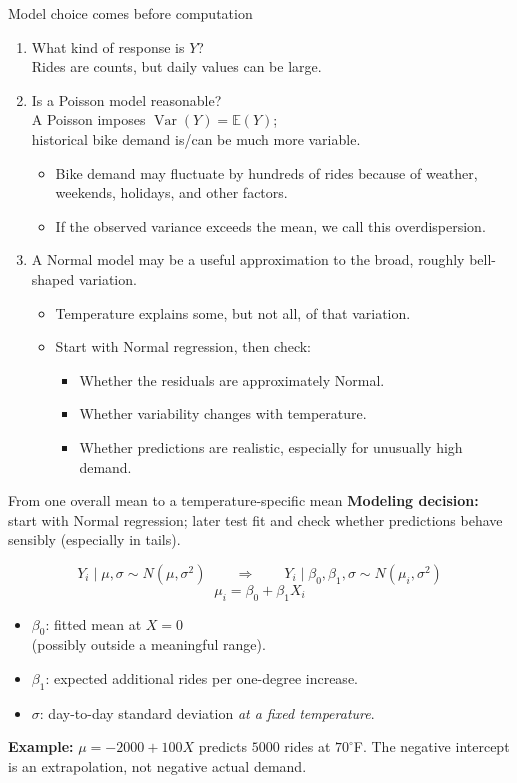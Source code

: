 \documentclass[aspectratio=43,11pt]{beamer}
\newcommand{\E}{\mathbb{E}}
\begin{document}
\begin{frame}{Model choice comes before computation}
\small
\begin{enumerate}
\item What kind of response is $Y$?\\ \footnotesize{Rides are counts, but daily values can be large.}
\item Is a Poisson model reasonable?\\\footnotesize{A Poisson imposes $\operatorname{Var}(Y)=\E(Y)$;\\historical bike demand is/can be much more variable.}
\begin{itemize}
\item \footnotesize{Bike demand may fluctuate by hundreds of rides because of weather, weekends, holidays, and other factors.}
\item \footnotesize{If the observed variance exceeds the mean, we call this overdispersion.}
\end{itemize}
\item A Normal model may be a useful approximation to the broad, roughly bell-shaped variation.
\begin{itemize}
\item \footnotesize{Temperature explains some, but not all, of that variation.}
\item \footnotesize{Start with Normal regression, then check:}
\begin{itemize}
\item \footnotesize{Whether the residuals are approximately Normal.}
\item \footnotesize{Whether variability changes with temperature.}
\item \footnotesize{Whether predictions are realistic, especially for unusually high demand.}
\end{itemize}
\end{itemize}
\end{enumerate}
\end{frame}

\begin{frame}{From one overall mean to a temperature-specific mean}
\textbf{Modeling decision:} start with Normal regression; later test fit and check whether predictions behave sensibly (especially in tails).

\[Y_i\mid\mu,\sigma\sim N(\mu,\sigma^2)\qquad\Longrightarrow\qquad
Y_i\mid\beta_0,\beta_1,\sigma\sim N(\mu_i,\sigma^2)\]
\[\boxed{\mu_i=\beta_0+\beta_1 X_i}\]

\begin{itemize}
\item $\beta_0$: fitted mean at $X=0$\\ \footnotesize{(possibly outside a meaningful range).}
\item $\beta_1$: expected additional rides per one-degree increase.
\item $\sigma$: day-to-day standard deviation \emph{at a fixed temperature}.
\end{itemize}
\par\medskip
\textbf{Example:} $\mu=-2000+100X$ predicts $5000$ rides at $70^\circ$F.
The negative intercept is an extrapolation, not negative actual demand.
\end{frame}
\end{document}

